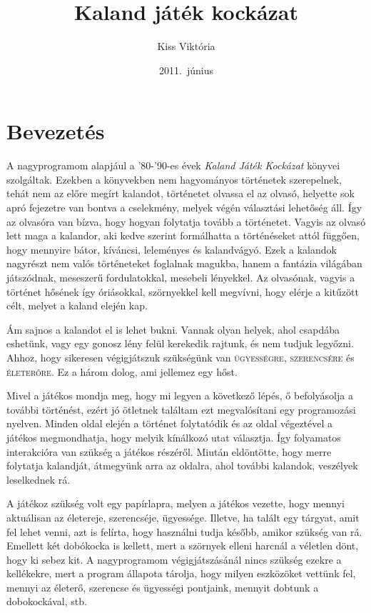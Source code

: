 \documentclass{article}
\begin{document}
\title{Kaland játék kockázat}
\author{Kiss Viktória}
\date{2011.\ június}
\maketitle
\newpage
\tableofcontents
\newpage
\section{Bevezetés}
  A nagyprogramom alapjául a '80-'90-es évek \emph{Kaland Játék Kockázat}
  könyvei szolgáltak. Ezekben a könyvekben nem hagyományos történetek
  szerepelnek, tehát nem az előre megírt kalandot, történetet olvassa el
  az olvasó, helyette sok apró fejezetre van bontva a cselekmény, melyek
  végén választási lehetőség áll. Így az olvasóra van bízva, hogy hogyan
  folytatja tovább a történetet. Vagyis az olvasó lett maga a kalandor,
  aki kedve szerint formálhatta a történéseket attól függően, hogy
  mennyire bátor, kíváncsi, leleményes és kalandvágyó. Ezek a kalandok
  nagyrészt nem valós történeteket foglalnak magukba, hanem a fantázia
  világában játszódnak, meseszerű fordulatokkal, mesebeli lényekkel. Az
  olvasónak, vagyis a történet hősének így óriásokkal, szörnyekkel kell
  megvívni, hogy elérje a kitűzött célt, melyet a kaland elején kap.
  
  Ám sajnos a kalandot el is lehet bukni. Vannak olyan helyek, ahol
  csapdába eshetünk, vagy egy gonosz lény felül kerekedik rajtunk, és
  nem tudjuk legyőzni. Ahhoz, hogy sikeresen végigjátszuk szükségünk
  van \textsc{ügyességre}, \textsc{szerencsére} és
  \textsc{életerőre}. Ez a három dolog, ami jellemez egy hőst.

  Mivel a játékos mondja meg, hogy mi legyen a következő lépés, ő
  befolyásolja a további történést, ezért jó ötletnek találtam ezt
  megvalósítani egy programozási nyelven. Minden oldal elején a történet
  folytatódik és az oldal végeztével a játékos megmondhatja, hogy
  melyik kínálkozó utat választja. Így folyamatos interakcióra van
  szükség a játékos részéről. Miután eldöntötte, hogy merre folytatja
  kalandját, átmegyünk arra az oldalra, ahol további kalandok, veszélyek
  leselkednek rá.
  
  A játékoz szükség volt egy papírlapra, melyen a játékos vezette, hogy
  mennyi aktuálisan az életereje, szerencséje, ügyessége. Illetve, ha
  talált egy tárgyat, amit fel lehet venni, azt is felírta, hogy
  használni tudja később, amikor szükség van rá. Emellett két dobókocka
  is kellett, mert a szörnyek elleni harcnál a véletlen dönt, hogy ki
  sebez kit. A nagyprogramom végigjátszásánál nincs szükség ezekre a
  kellékekre, mert a program állapota tárolja, hogy milyen eszközöket vettünk
  fel, mennyi az életerő, szerencse és ügyességi pontjaink, mennyit
  dobtunk a dobokockával, stb.
  
\end{document}
